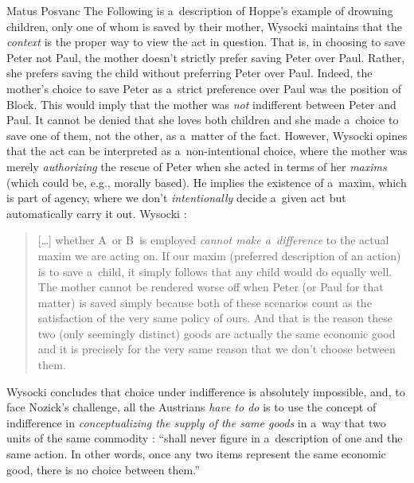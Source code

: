 \begin{artengenv}{Matus Posvanc}
The Following is a~description of Hoppe's example of drowning children, only one of whom is saved by their mother, Wysocki maintains that the \textit{context} is the proper way to view the act in question. That is, in choosing to save Peter not Paul, the mother doesn't strictly prefer saving Peter over Paul. Rather, she prefers saving the child without preferring Peter over Paul. Indeed, the mother's choice to save Peter as a~strict preference over Paul was the position of Block. This would imply that the mother was \textit{not} indifferent between Peter and Paul. It cannot be denied that she loves both children and she made a~choice to save one of them, not the other, as a~matter of the fact. However, Wysocki opines that the act can be interpreted as a~non-intentional choice, where the mother was merely \textit{authorizing} the rescue of Peter when she acted in terms of her \textit{maxims} (which could be, e.g., morally based). He implies the existence of a~maxim, which is part of agency, where we don't \textit{intentionally} decide a~given act but automatically carry it out. Wysocki 
\parencite*[][emphasis his]{Wysocki2021problem}:%




\begin{quote}
[…] whether A~or B~is employed \textit{cannot make a~difference} to the actual maxim we are acting on. If our maxim (preferred description of an action) is to save a~child, it simply follows that any child would do equally well. The mother cannot be rendered worse off when Peter (or Paul for that matter) is saved simply because both of these scenarios count as the satisfaction of the very same policy of ours. And that is the reason these two (only seemingly distinct) goods are actually the same economic good and it is precisely for the very same reason that we don't choose between them.
\end{quote}



Wysocki concludes that choice under indifference is absolutely impossible, and, to face Nozick's challenge, all the Austrians \textit{have to do} is to use the concept of indifference in \textit{conceptualizing the supply of the same goods} in a~way that two units of the same commodity 
\parencite[][p.37]{Wysocki2021problem}: %
 ``shall never figure in a~description of one and the same action. In other words, once any two items represent the same economic good, there is no choice between them.''




\end{artengenv}
